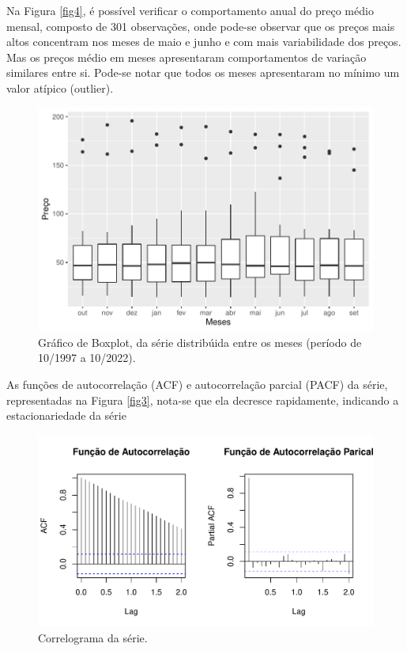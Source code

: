 \documentclass[
	12pt,				%
	openright,			%
	oneside,      %
	a4paper,			%
	english,			%
	french,				%
	spanish,			%
	brazil,				%
	]{abntex2}\usepackage[]{graphicx}\usepackage[table]{xcolor}
\makeatletter
\def\maxwidth{ %
  \ifdim\Gin@nat@width>\linewidth
    \linewidth
  \else
    \Gin@nat@width
  \fi
}
\newenvironment{knitrout}{}{} %
\theoremstyle{definition}
\theoremstyle{remark}
\makeatother
\begin{document}
Na Figura \ref{fig4}, é possível verificar o comportamento anual do preço médio mensal, composto de 301 observações, onde pode-se observar que os preços mais altos concentram nos meses de maio e junho e com mais variabilidade dos preços. Mas os preços médio em meses apresentaram comportamentos de variação similares entre si. Pode-se notar que todos os meses apresentaram no mínimo um valor atípico (outlier).

\begin{knitrout}
\color{fgcolor}\begin{figure}[H]
\includegraphics[width=\maxwidth]{figure/script5-1} \caption[ Gráfico de Boxplot, da série distribúida entre os meses (período de 10/1997 a 10/2022)]{ Gráfico de Boxplot, da série distribúida entre os meses (período de 10/1997 a 10/2022).\label{fig4}}\label{fig:script5}
\end{figure}

\end{knitrout}


As funções de autocorrelação (ACF) e autocorrelação parcial (PACF) da série, representadas na Figura \ref{fig3}, nota-se que ela decresce rapidamente, indicando a estacionariedade da série 


\begin{knitrout}
\color{fgcolor}\begin{figure}
\includegraphics[width=\maxwidth]{figure/script4-1} \caption[Correlograma da série]{Correlograma da série.\label{fig3}}\label{fig:script4}
\end{figure}

\end{knitrout}
\end{document}
